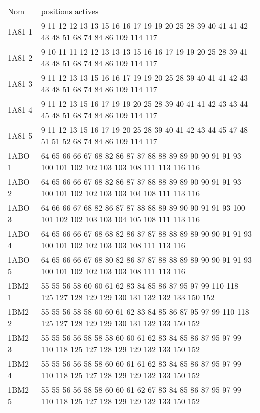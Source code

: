     \begin{table}[!htbp]
      \centering

      \begin{tabular}{ll}

        \toprule
        Nom & positions actives \\
        \cmidrule{1-2}
        1A81 1 & 9 11 12 12 13 13 15 16 16 17 19 19 20 25 28 39 40 41 41 42 43 48 51 68 74 84 86 109 114 117 \\
        1A81 2 & 9 10 11 11 12 12 13 13 13 15 16 16 17 19 19 20 25 28 39 41 43 48 51 68 74 84 86 109 114 117 \\
        1A81 3 & 9 11 12 13 13 15 16 16 17 19 19 20 25 28 39 40 41 41 42 43 43 48 51 68 74 84 86 109 114 117 \\
        1A81 4 & 9 11 12 13 15 16 17 19 19 20 25 28 39 40 41 41 42 43 43 44 45 48 51 68 74 84 86 109 114 117 \\
        1A81 5 & 9 11 12 13 15 16 17 19 20 25 28 39 40 41 42 43 44 45 47 48 51 51 52 68 74 84 86 109 114 117 \\
        1ABO 1 & 64 65 66 66 67 68 82 86 87 87 88 88 89 89 90 90 91 91 93 100 101 102 102 103 103 108 111 113 116 116 \\
        1ABO 2 & 64 65 66 66 67 68 82 86 87 87 88 88 89 89 90 90 91 91 93 100 101 102 102 103 103 104 108 111 113 116 \\
        1ABO 3 & 64 66 66 67 68 82 86 87 87 88 88 89 89 90 90 91 91 93 100 101 102 102 103 103 104 105 108 111 113 116 \\
        1ABO 4 & 64 65 66 66 67 68 68 82 86 87 87 88 88 89 89 90 90 91 91 93 100 101 102 102 103 103 108 111 113 116 \\
        1ABO 5 & 64 65 66 66 67 68 80 82 86 87 87 88 88 89 89 90 90 91 91 93 100 101 102 102 103 103 108 111 113 116 \\
        1BM2 1 & 55 55 56 58 60 60 61 62 83 84 85 86 87 95 97 99 110 118 125 127 128 129 129 130 131 132 132 133 150 152 \\
        1BM2 2 & 55 55 56 58 58 60 60 61 62 83 84 85 86 87 95 97 99 110 118 125 127 128 129 129 130 131 132 133 150 152 \\
        1BM2 3 & 55 55 56 56 58 58 58 60 60 61 62 83 84 85 86 87 95 97 99 110 118 125 127 128 129 129 132 133 150 152 \\
        1BM2 4 & 55 55 56 56 58 58 60 60 61 61 62 83 84 85 86 87 95 97 99 110 118 125 127 128 129 129 132 133 150 152 \\
        1BM2 5 & 55 55 56 56 58 58 60 60 61 62 67 83 84 85 86 87 95 97 99 110 118 125 127 128 129 129 132 133 150 152 \\

\end{tabular}
\end{table}
